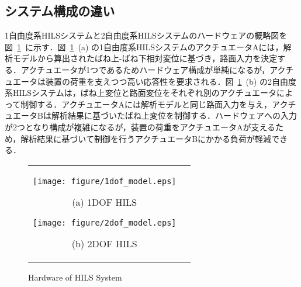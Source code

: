 \documentclass{article_vdlab_sotsuron_youshi}
\begin{document}
\subsection{システム構成の違い}
1自由度系HILSシステムと2自由度系HILSシステムのハードウェアの概略図を図~\ref{fig:1dof_2dof}~に示す．図~\ref{fig:1dof_2dof}~(a) の1自由度系HILSシステムのアクチュエータAには，解析モデルから算出されたばね上-ばね下相対変位に基づき，路面入力を決定する．アクチュエータが1つであるためハードウェア構成が単純になるが，アクチュエータは装置の荷重を支えつつ高い応答性を要求される．図~\ref{fig:1dof_2dof}~(b) の2自由度系HILSシステムは，ばね上変位と路面変位をそれぞれ別のアクチュエータによって制御する．アクチュエータAには解析モデルと同じ路面入力を与え，アクチュエータBは解析結果に基づいたばね上変位を制御する．ハードウェアへの入力が2つとなり構成が複雑になるが，装置の荷重をアクチュエータAが支えるため，解析結果に基づいて制御を行うアクチュエータBにかかる負荷が軽減できる．

\vspace*{-2mm}
\begin{figure}[H]
  \begin{tabular}{cc}
  \begin{minipage}{0.5\hsize}
    \vspace*{6mm}
  \begin{center} 
    \hspace*{8mm}
    \texttt{[image: figure/1dof\_model.eps]}
    \end{center}
    \begin{center}
    \vspace*{-4mm}
    \ (a) 1DOF HILS\
    \end{center}
  \end{minipage}
  \hspace*{-5mm}
  \begin{minipage}{0.4\hsize}
     \begin{center}
     \hspace*{8mm}
      \texttt{[image: figure/2dof\_model.eps]}
      \end{center}
      \begin{center}
      \vspace*{-4mm}
      \ (b) 2DOF HILS\
    \end{center}
  \end{minipage}
  \end{tabular}
    \vspace*{1mm}
    \caption{Hardware of HILS System}
    \label{fig:1dof_2dof}
 \end{figure}
\end{document}
